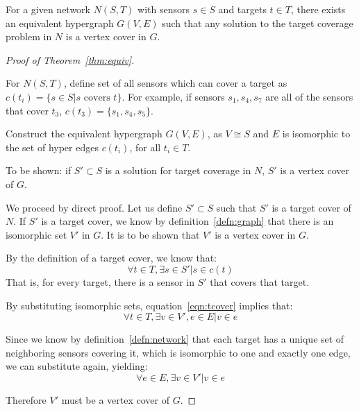 \begin{thm}
  For a given network $N(S,T)$ with sensors $s\in S$ and targets $t\in T$, there exists an equivalent hypergraph $G(V,E)$ such that any solution to the target coverage problem in $N$ is a vertex cover in $G$.
\label{thm:equiv}
\end{thm}
\begin{proof}[Proof of Theorem~\ref{thm:equiv}]
\begin{defn}
For $N(S,T)$, define set of all sensors which can cover a target as $c(t_i) = \{s \in S | s \text{\ covers\ } t\}$.  For example, if sensors $s_1, s_4, s_7$ are all of the sensors that cover $t_3$, $c(t_3) = \{s_1, s_4, s_5\}$. \label{defn:network}
\end{defn}
\begin{defn}Construct the equivalent hypergraph $G(V,E)$, as $V \cong S$ and $E$ is isomorphic to the set of hyper edges $c(t_i)$, for all $t_i \in T$. 
\label{defn:graph}
\end{defn}

To be shown: if $S' \subset S$ is a solution for target coverage in $N$, $S'$ is a vertex cover of $G$. 

We proceed by direct proof. Let us define $S'\subset S$ such that $S'$ is a target cover of $N$. If $S'$ is a target cover, we know by definition~\ref{defn:graph} that there is an isomorphic set $V'$ in $G$. It is to be shown that $V'$ is a vertex cover in $G$.

By the definition of a target cover, we know that:
\begin{equation}
\forall t \in T, \exists s \in S' | s \in c(t)
\label{eqn:tcover}
\end{equation}
That is, for every target, there is a sensor in $S'$ that covers that target.

By substituting isomorphic sets, equation~\ref{eqn:tcover} implies that:
\begin{equation}
\forall t \in T, \exists v \in V', e \in E | v \in e
\label{eqn:tvbridge}
\end{equation}

Since we know by definition~\ref{defn:network} that each target has a unique set of neighboring sensors covering it, which is isomorphic to one and exactly one edge, we can substitute again, yielding:
\begin{equation}
\forall e \in E, \exists v\in V' | v \in e
\end{equation}

Therefore $V'$ must be a vertex cover of $G$.  
\end{proof}
